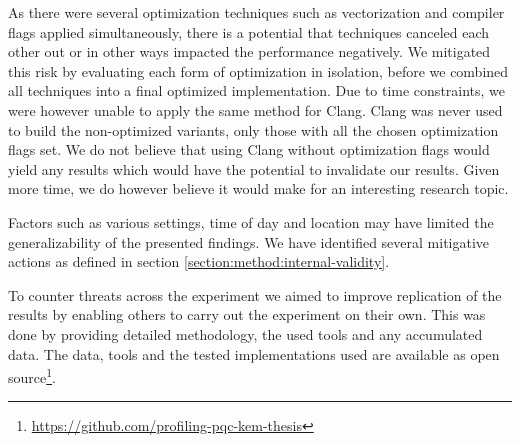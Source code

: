 As there were several optimization techniques such as vectorization and compiler flags applied simultaneously, there is a potential that techniques canceled each other out or in other ways impacted the performance negatively. We mitigated this risk by evaluating each form of optimization in isolation, before we combined all techniques into a final optimized implementation. Due to time constraints, we were however unable to apply the same method for Clang. Clang was never used to build the non-optimized variants, only those with all the chosen optimization flags set. We do not believe that using Clang without optimization flags would yield any results which would have the potential to invalidate our results. Given more time, we do however believe it would make for an interesting research topic.

Factors such as various settings, time of day and location may have limited the generalizability of the presented findings. We have identified several mitigative actions as defined in section \ref{section:method:internal-validity}.

To counter threats across the experiment we aimed to improve replication of the results by enabling others to carry out the experiment on their own. This was done by providing detailed methodology, the used tools and any accumulated data. The data, tools and the tested implementations used are available as open source\footnote{\url{https://github.com/profiling-pqc-kem-thesis}}.

\iffalse
{}

